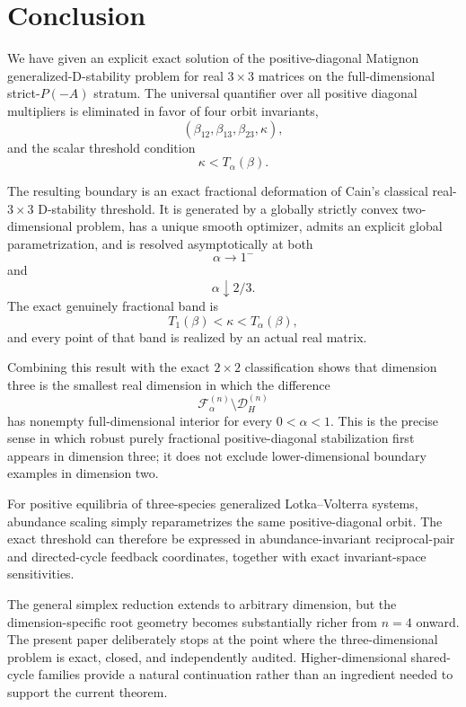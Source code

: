 \section{Conclusion}
\label{sec:conclusion}

We have given an explicit exact solution of the positive-diagonal Matignon generalized-D-stability problem for real \(3\times3\) matrices on the full-dimensional strict-\(P(-A)\) stratum. The universal quantifier over all positive diagonal multipliers is eliminated in favor of four orbit invariants,
\[
(\beta_{12},\beta_{13},\beta_{23},\kappa),
\]
and the scalar threshold condition
\[
\kappa<T_\alpha(\beta).
\]

The resulting boundary is an exact fractional deformation of Cain's classical real-\(3\times3\) D-stability threshold. It is generated by a globally strictly convex two-dimensional problem, has a unique smooth optimizer, admits an explicit global parametrization, and is resolved asymptotically at both
\[
\alpha\to1^-
\]
and
\[
\alpha\downarrow2/3.
\]
The exact genuinely fractional band is
\[
T_1(\beta)<\kappa<T_\alpha(\beta),
\]
and every point of that band is realized by an actual real matrix.

Combining this result with the exact \(2\times2\) classification shows that dimension three is the smallest real dimension in which the difference
\[
\mathcal F_\alpha^{(n)}
\setminus
\mathcal D_H^{(n)}
\]
has nonempty full-dimensional interior for every \(0<\alpha<1\). This is the precise sense in which robust purely fractional positive-diagonal stabilization first appears in dimension three; it does not exclude lower-dimensional boundary examples in dimension two.

For positive equilibria of three-species generalized Lotka--Volterra systems, abundance scaling simply reparametrizes the same positive-diagonal orbit. The exact threshold can therefore be expressed in abundance-invariant reciprocal-pair and directed-cycle feedback coordinates, together with exact invariant-space sensitivities.

The general simplex reduction extends to arbitrary dimension, but the dimension-specific root geometry becomes substantially richer from \(n=4\) onward. The present paper deliberately stops at the point where the three-dimensional problem is exact, closed, and independently audited. Higher-dimensional shared-cycle families provide a natural continuation rather than an ingredient needed to support the current theorem.

